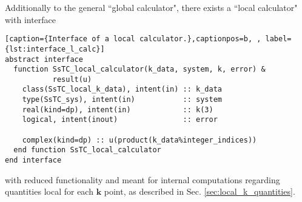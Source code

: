 \documentclass[10pt,a4paper]{article}
\begin{document}
Additionally to the general ``global calculator", there exists a ``local calculator" with interface
\begin{lstlisting}[caption={Interface of a local calculator.},captionpos=b, , label={lst:interface_l_calc}]
abstract interface
  function SsTC_local_calculator(k_data, system, k, error) &
           result(u)
    class(SsTC_local_k_data), intent(in) :: k_data
    type(SsTC_sys), intent(in)           :: system
    real(kind=dp), intent(in)            :: k(3)
    logical, intent(inout)               :: error

    complex(kind=dp) :: u(product(k_data%integer_indices))
  end function SsTC_local_calculator
end interface
\end{lstlisting}
with reduced functionality and meant for internal computations regarding quantities local for each $\bm{k}$ point, as described in Sec. \ref{sec:local_k_quantities}.
\end{document}
